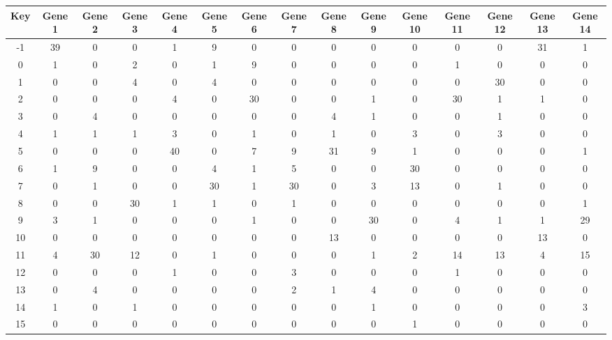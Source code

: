 \begin{tabular}{|c|c|c|c|c|c|c|c|c|c|c|c|c|c|c|}
\hline
Key & Gene 1 & Gene 2 & Gene 3 & Gene 4 & Gene 5 & Gene 6 & Gene 7 & Gene 8 & Gene 9 & Gene 10 & Gene 11 & Gene 12 & Gene 13 & Gene 14 \\
\hline
-1 & 39 & 0 & 0 & 1 & 9 & 0 & 0 & 0 & 0 & 0 & 0 & 0 & 31 & 1 \\
0 & 1 & 0 & 2 & 0 & 1 & 9 & 0 & 0 & 0 & 0 & 1 & 0 & 0 & 0 \\
1 & 0 & 0 & 4 & 0 & 4 & 0 & 0 & 0 & 0 & 0 & 0 & 30 & 0 & 0 \\
2 & 0 & 0 & 0 & 4 & 0 & 30 & 0 & 0 & 1 & 0 & 30 & 1 & 1 & 0 \\
3 & 0 & 4 & 0 & 0 & 0 & 0 & 0 & 4 & 1 & 0 & 0 & 1 & 0 & 0 \\
4 & 1 & 1 & 1 & 3 & 0 & 1 & 0 & 1 & 0 & 3 & 0 & 3 & 0 & 0 \\
5 & 0 & 0 & 0 & 40 & 0 & 7 & 9 & 31 & 9 & 1 & 0 & 0 & 0 & 1 \\
6 & 1 & 9 & 0 & 0 & 4 & 1 & 5 & 0 & 0 & 30 & 0 & 0 & 0 & 0 \\
7 & 0 & 1 & 0 & 0 & 30 & 1 & 30 & 0 & 3 & 13 & 0 & 1 & 0 & 0 \\
8 & 0 & 0 & 30 & 1 & 1 & 0 & 1 & 0 & 0 & 0 & 0 & 0 & 0 & 1 \\
9 & 3 & 1 & 0 & 0 & 0 & 1 & 0 & 0 & 30 & 0 & 4 & 1 & 1 & 29 \\
10 & 0 & 0 & 0 & 0 & 0 & 0 & 0 & 13 & 0 & 0 & 0 & 0 & 13 & 0 \\
11 & 4 & 30 & 12 & 0 & 1 & 0 & 0 & 0 & 1 & 2 & 14 & 13 & 4 & 15 \\
12 & 0 & 0 & 0 & 1 & 0 & 0 & 3 & 0 & 0 & 0 & 1 & 0 & 0 & 0 \\
13 & 0 & 4 & 0 & 0 & 0 & 0 & 2 & 1 & 4 & 0 & 0 & 0 & 0 & 0 \\
14 & 1 & 0 & 1 & 0 & 0 & 0 & 0 & 0 & 1 & 0 & 0 & 0 & 0 & 3 \\
15 & 0 & 0 & 0 & 0 & 0 & 0 & 0 & 0 & 0 & 1 & 0 & 0 & 0 & 0 \\
\hline
\end{tabular}
